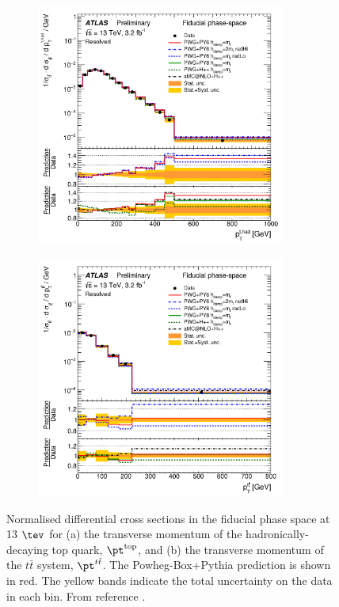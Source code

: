 \begin{figure}[h!]
\begin{subfigure}{0.5\textwidth}
  \centering
  \includegraphics[width=0.9\textwidth]{figures/Datasamples/topptatlas13tev.png}
  \caption{}
  \label{fig:dat:ttl:top13}
\end{subfigure}
\begin{subfigure}{0.5\textwidth}
  \centering
  \includegraphics[width=0.9\textwidth]{figures/Datasamples/ttbarptatlas13tev.png}
  \caption{}
  \label{fig:dat:ttl:ttbar13}
\end{subfigure}

\captionsetup{width=0.85\textwidth} \caption{\small Normalised differential cross sections in the fiducial phase space at 13 $\tev$ for (a) the transverse momentum of the hadronically-decaying top quark, $\pt^{\rm top}$, and (b) the transverse momentum of the $t\bar{t}$ system, $\pt^{t\bar{t}}$. The {\sc Powheg-Box+Pythia} prediction is shown in red. The yellow bands indicate the total uncertainty on the data in each bin. From reference \cite{ATLAS-CONF-2016-040}.}
\label{fig:dat:ttl:13tev}
\end{figure}
